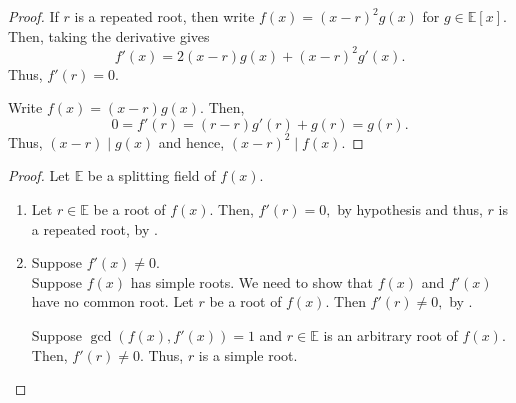 \derivcritreproot*\label{prop:derivcritreproot2}
\begin{flushright}\hyperref[prop:derivcritreproot]{\upsym}\end{flushright}
\begin{proof}
    \forward If $r$ is a repeated root, then write $f(x) = (x - r)^2g(x)$ for $g \in \mathbb{E}[x].$ Then, taking the derivative gives
    \begin{equation*} 
        f'(x) = 2(x - r)g(x) + (x - r)^2g'(x).
    \end{equation*}
    Thus, $f'(r) = 0.$

    \backward Write $f(x) = (x - r)g(x).$ Then,
    \begin{equation*} 
        0 = f'(r) = (r - r)g'(r) + g(r) = g(r).
    \end{equation*}
    Thus, $(x - r) \mid g(x)$ and hence, $(x - r)^2 \mid f(x).$
\end{proof}

\derivcritsep*\label{thm:derivcritsep2}
\begin{flushright}\hyperref[thm:derivcritsep]{\upsym}\end{flushright}
\begin{proof}
    Let $\mathbb{E}$ be a splitting field of $f(x).$
    \begin{enumerate}[leftmargin=*]
        \item Let $r \in \mathbb{E}$ be a root of $f(x).$ Then, $f'(r) = 0,$ by hypothesis and thus, $r$ is a repeated root, by .
        \item Suppose $f'(x) \neq 0.$\\
        \forward Suppose $f(x)$ has simple roots. We need to show that $f(x)$ and $f'(x)$ have no common root. Let $r$ be a root of $f(x).$ Then $f'(r) \neq 0,$ by .

        \backward Suppose $\gcd(f(x), f'(x)) = 1$ and $r \in \mathbb{E}$ is an arbitrary root of $f(x).$ Then, $f'(r) \neq 0.$ Thus, $r$ is a simple root. \qedhere
    \end{enumerate}
\end{proof}

